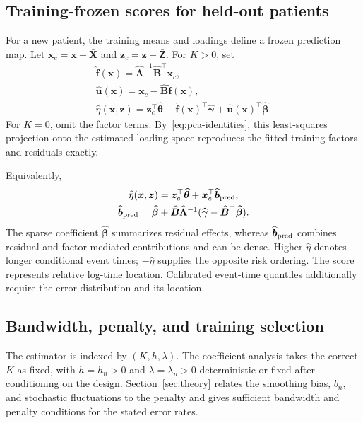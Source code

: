 \subsection{Training-frozen scores for held-out patients}
\label{subsec:out-of-sample-map}
For a new patient, the training means and loadings define a frozen prediction map. Let $\bm{x}_c=\bm{x}-\bar{\bm{X}}$ and $\bm{z}_c=\bm{z}-\bar{\bm{Z}}$. For $K>0$, set
\begin{equation}
 \begin{gathered}
\widehat{\bm{f}}(\bm{x})=\widehat{\bm{\Lambda}}^{-1}\widehat{\bm{B}}^\top \bm{x}_c,\\
 \widehat{\bm{u}}(\bm{x})=\bm{x}_c-\widehat{\bm{B}}\widehat{\bm{f}}(\bm{x}),\\
 \widehat\eta(\bm{x},\bm{z})=\bm{z}_c^\top\widehat{\bm{\theta}}+
       \widehat{\bm{f}}(\bm{x})^\top\widehat{\bm{\gamma}}+
       \widehat{\bm{u}}(\bm{x})^\top\widehat{\bm{\beta}}.
 \end{gathered}
 \label{eq:frozen-score-map}
\end{equation}
For $K=0$, omit the factor terms. By~\eqref{eq:pca-identities}, this least-squares projection onto the estimated loading space reproduces the fitted training factors and residuals exactly.

Equivalently,
\begin{equation}
 \begin{gathered}
\widehat\eta(\bm{x},\bm{z})=\bm{z}_c^\top\widehat{\bm{\theta}}+\bm{x}_c^\top\widehat{\bm{b}}_{\rm pred},\\
 \widehat{\bm{b}}_{\rm pred}
 =\widehat{\bm{\beta}}+\widehat{\bm{B}}\widehat{\bm{\Lambda}}^{-1}
         (\widehat{\bm{\gamma}}-\widehat{\bm{B}}^\top\widehat{\bm{\beta}}).
 \end{gathered}
 \label{eq:prediction-coefficients}
\end{equation}
The sparse coefficient $\widehat{\bm{\beta}}$ summarizes residual effects, whereas $\widehat{\bm{b}}_{\rm pred}$ combines residual and factor-mediated contributions and can be dense. Higher $\widehat\eta$ denotes longer conditional event times; $-\widehat\eta$ supplies the opposite risk ordering. The score represents relative log-time location. Calibrated event-time quantiles additionally require the error distribution and its location.

\subsection{Bandwidth, penalty, and training selection}
\label{subsec:tuning-interface}
The estimator is indexed by $(K,h,\lambda)$. The coefficient analysis takes the correct $K$ as fixed, with $h=h_n>0$ and $\lambda=\lambda_n>0$ deterministic or fixed after conditioning on the design. Section~\ref{sec:theory} relates the smoothing bias, $b_n$, and stochastic fluctuations to the penalty and gives sufficient bandwidth and penalty conditions for the stated error rates.

